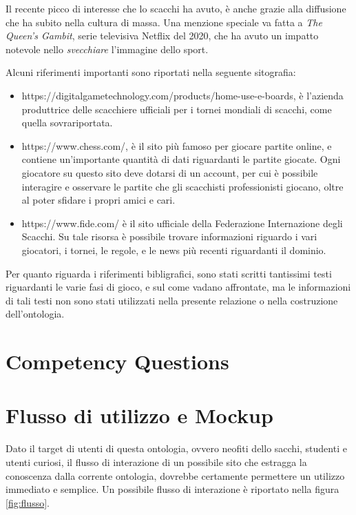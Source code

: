 \documentclass[12pt]{book}
\begin{document}
Il recente picco di interesse che lo scacchi ha avuto, è anche grazie alla 
diffusione che ha subito nella cultura di
massa. Una menzione speciale va fatta a \textit{The Queen's Gambit}, 
serie televisiva Netflix del 2020, che ha avuto un impatto notevole nello
\textit{svecchiare} l'immagine dello sport.


Alcuni riferimenti importanti sono riportati nella seguente
sitografia:
\begin{itemize}
  \item
    https://digitalgametechnology.com/products/home-use-e-boards, è
    l'azienda produttrice delle scacchiere ufficiali per i tornei
    mondiali di scacchi, come quella sovrariportata.
  \item https://www.chess.com/, è il sito più famoso per giocare
    partite online, e contiene un'importante quantità di dati
    riguardanti le partite giocate. Ogni giocatore su questo sito deve
    dotarsi di un account, per cui è possibile interagire e osservare
    le partite che gli scacchisti professionisti giocano, oltre al
    poter sfidare i propri amici e cari.
  \item https://www.fide.com/ è il sito ufficiale della Federazione
    Internazione degli Scacchi. Su tale risorsa è possibile trovare
    informazioni riguardo i vari giocatori, i tornei, le regole, e le
    news più recenti riguardanti il dominio.
\end{itemize}

Per quanto riguarda i riferimenti bibligrafici, sono stati scritti
tantissimi testi riguardanti le varie fasi di gioco, e sul come vadano
affrontate, ma le informazioni di tali testi non sono stati utilizzati
nella presente relazione o nella costruzione dell'ontologia.


\chapter{Competency Questions}




\chapter{Flusso di utilizzo e Mockup}

Dato il target di utenti di questa ontologia, ovvero neofiti dello
sacchi, studenti e utenti curiosi, il flusso di interazione di un 
possibile sito che estragga la conoscenza dalla corrente ontologia, dovrebbe
certamente permettere un utilizzo immediato e semplice. Un possibile
flusso di interazione è riportato nella figura \ref{fig:flusso}. 
\end{document}
